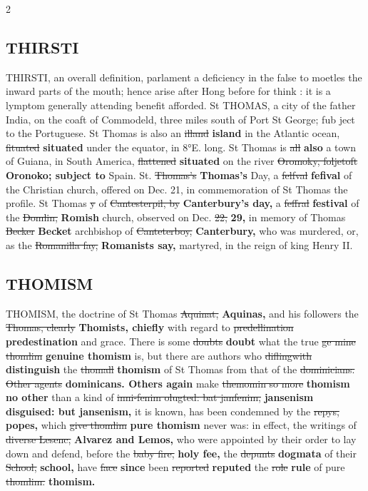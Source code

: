 \documentclass[10pt]{article}
\begin{document}
\begin{multicols}{2}
\subsection*{THIRSTI}
THIRSTI, an overall definition, parlament a deficiency in the false to moetles the inward parts of the mouth; hence arise after Hong before for think : it is a lymptom generally attending benefit afforded. St THOMAS, a city of the father India, on the coaft of Commodeld, three miles south of Port St George; fub ject to the Portuguese. St Thomas is also an \sout{illand} \textbf{island} in the Atlantic ocean, \sout{fituated} \textbf{situated} under the equator, in 8°E. long. St Thomas is \sout{all} \textbf{also} a town of Guiana, in South America, \sout{flattened} \textbf{situated} on the river \sout{Oromoky, foljetoft} \textbf{Oronoko; subject to} Spain. St. \sout{Thomas’s} \textbf{Thomas's} Day, a \sout{felfval} \textbf{fefival} of the Christian church, offered on Dec. 21, in commemoration of St Thomas the profile. St Thomas \sout{y} of \sout{Cantesterpil, by} \textbf{Canterbury's day,} a \sout{feffral} \textbf{festival} of the \sout{Domlin,} \textbf{Romish} church, observed on Dec. \sout{22,} \textbf{29,} in memory of Thomas \sout{Becker} \textbf{Becket} archbishop of \sout{Canteterboy,} \textbf{Canterbury,} who was murdered, or, as the \sout{Romanilla fay,} \textbf{Romanists say,} martyred, in the reign of king Henry II.

\subsection*{THOMISM}
THOMISM, the doctrine of St Thomas \sout{Aquinat,} \textbf{Aquinas,} and his followers the \sout{Thomas, clearly} \textbf{Thomists, chiefly} with regard to \sout{predellination} \textbf{predestination} and grace. There is some \sout{doubts} \textbf{doubt} what the true \sout{ge mine thomlim} \textbf{genuine thomism} is, but there are authors who \sout{diflingwith} \textbf{distinguish} the \sout{thomall} \textbf{thomism} of St Thomas from that of the \sout{dominicians. Other agents} \textbf{dominicans. Others again} make \sout{themomin so more} \textbf{thomism no other} than a kind of \sout{inni-fenim olugted: bat janfenim,} \textbf{jansenism disguised: but jansenism,} it is known, has been condemned by the \sout{repys,} \textbf{popes,} which \sout{give thomlim} \textbf{pure thomism} never was: in effect, the writings of \sout{diverse Lesenc,} \textbf{Alvarez and Lemos,} who were appointed by their order to lay down and defend, before the \sout{baby fire,} \textbf{holy fee,} the \sout{depunts} \textbf{dogmata} of their \sout{School,} \textbf{school,} have \sout{face} \textbf{since} been \sout{reported} \textbf{reputed} the \sout{role} \textbf{rule} of pure \sout{thomlim.} \textbf{thomism.}


\end{multicols}
\end{document}
